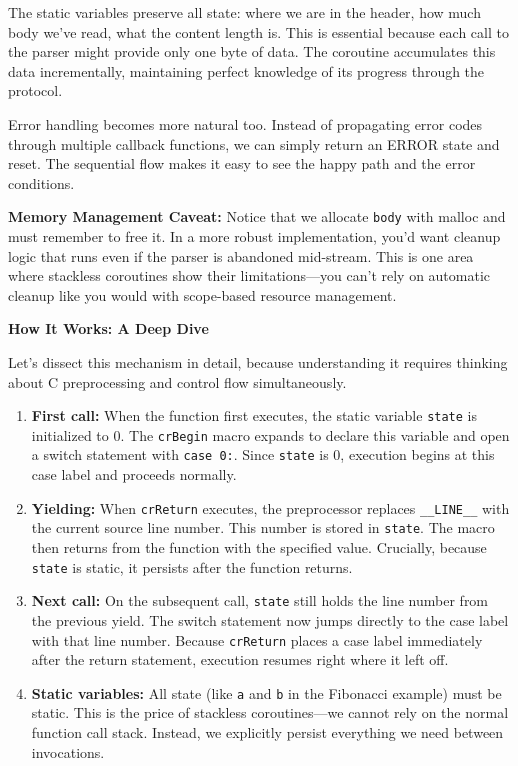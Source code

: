 The static variables preserve all state: where we are in the header, how much body we've read, what the content length is. This is essential because each call to the parser might provide only one byte of data. The coroutine accumulates this data incrementally, maintaining perfect knowledge of its progress through the protocol.

Error handling becomes more natural too. Instead of propagating error codes through multiple callback functions, we can simply return an ERROR state and reset. The sequential flow makes it easy to see the happy path and the error conditions.

\begin{warningbox}
\textbf{Memory Management Caveat:} Notice that we allocate \texttt{body} with malloc and must remember to free it. In a more robust implementation, you'd want cleanup logic that runs even if the parser is abandoned mid-stream. This is one area where stackless coroutines show their limitations---you can't rely on automatic cleanup like you would with scope-based resource management.
\end{warningbox}

\vspace{0.3cm}
\noindent\textbf{\large How It Works: A Deep Dive}

\vspace{0.2cm}
\noindent Let's dissect this mechanism in detail, because understanding it requires thinking about C preprocessing and control flow simultaneously.

\begin{enumerate}[leftmargin=*]
    \item \textbf{First call:} When the function first executes, the static variable \texttt{state} is initialized to 0. The \texttt{crBegin} macro expands to declare this variable and open a switch statement with \texttt{case 0:}. Since \texttt{state} is 0, execution begins at this case label and proceeds normally.

    \item \textbf{Yielding:} When \texttt{crReturn} executes, the preprocessor replaces \texttt{\_\_LINE\_\_} with the current source line number. This number is stored in \texttt{state}. The macro then returns from the function with the specified value. Crucially, because \texttt{state} is static, it persists after the function returns.

    \item \textbf{Next call:} On the subsequent call, \texttt{state} still holds the line number from the previous yield. The switch statement now jumps directly to the case label with that line number. Because \texttt{crReturn} places a case label immediately after the return statement, execution resumes right where it left off.

    \item \textbf{Static variables:} All state (like \texttt{a} and \texttt{b} in the Fibonacci example) must be static. This is the price of stackless coroutines---we cannot rely on the normal function call stack. Instead, we explicitly persist everything we need between invocations.
\end{enumerate}


